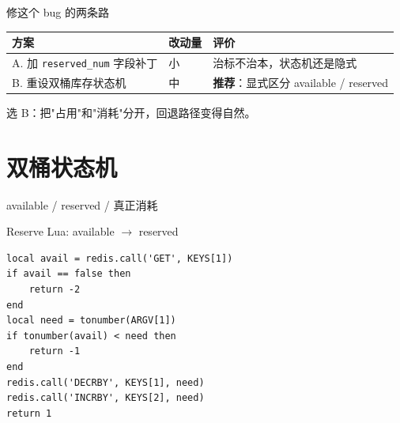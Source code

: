 \begin{frame}{修这个 bug 的两条路}
\begin{tabular}{@{}lll@{}}
\toprule
方案 & 改动量 & 评价 \\
\midrule
A. 加 \texttt{reserved\_num} 字段补丁 & 小 & 治标不治本，状态机还是隐式 \\
B. 重设双桶库存状态机 & 中 & \textbf{推荐}：显式区分 available / reserved \\
\bottomrule
\end{tabular}
\vspace{3mm}
\small 选 B：把"占用"和"消耗"分开，回退路径变得自然。
\end{frame}

\section{双桶状态机}

\begin{frame}{available / reserved / 真正消耗}
\vspace{2mm}
\end{frame}

\begin{frame}[fragile]{Reserve Lua: available $\to$ reserved}
\begin{lstlisting}[language=LuaRedis,firstnumber=32,
  caption={\srcnote{repository/cache/inventory.go:32--44}}]
local avail = redis.call('GET', KEYS[1])
if avail == false then
    return -2
end
local need = tonumber(ARGV[1])
if tonumber(avail) < need then
    return -1
end
redis.call('DECRBY', KEYS[1], need)
redis.call('INCRBY', KEYS[2], need)
return 1
\end{lstlisting}
\end{frame}


